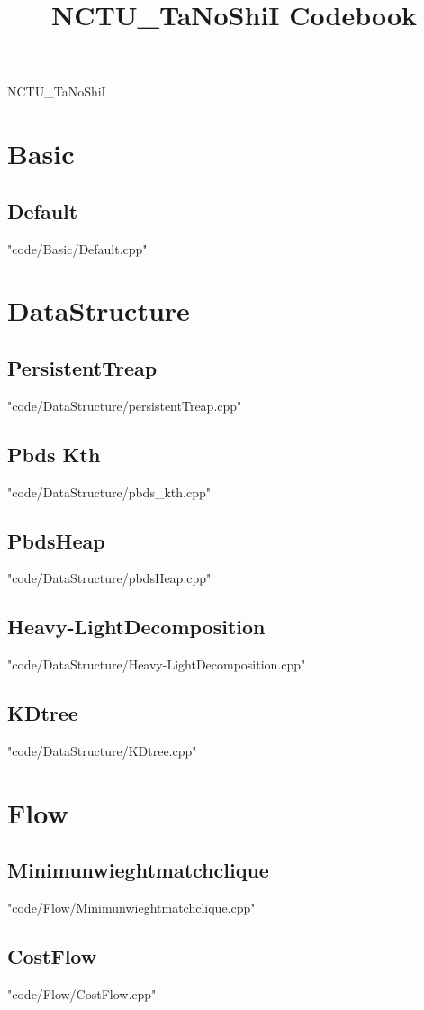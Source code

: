 \documentclass [8pt,a4paper,twocolumn]{article}
\title {NCTU\_TaNoShiI Codebook}
\begin{document}
\thispagestyle{fancy}
{ \Huge NCTU\_TaNoShiI}
\tableofcontents

\section{Basic}
\subsection{Default}
 {"code/Basic/Default.cpp"}
\section{DataStructure}
\subsection{PersistentTreap}
 {"code/DataStructure/persistentTreap.cpp"}
\subsection{Pbds Kth}
 {"code/DataStructure/pbds_kth.cpp"}
\subsection{PbdsHeap}
 {"code/DataStructure/pbdsHeap.cpp"}
\subsection{Heavy-LightDecomposition}
 {"code/DataStructure/Heavy-LightDecomposition.cpp"}
\subsection{KDtree}
 {"code/DataStructure/KDtree.cpp"}
\section{Flow}
\subsection{Minimunwieghtmatchclique}
 {"code/Flow/Minimunwieghtmatchclique.cpp"}
\subsection{CostFlow}
 {"code/Flow/CostFlow.cpp"}
\end{document}
